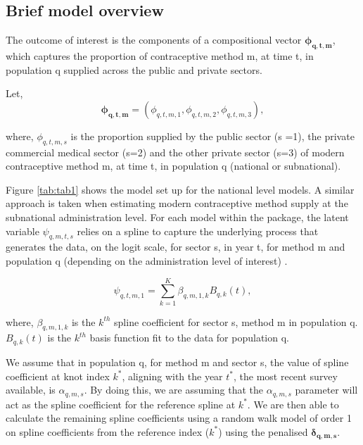 \hypertarget{brief-model-overview}{%
\subsection{Brief model overview}\label{brief-model-overview}}

The outcome of interest is the components of a compositional vector \(\boldsymbol{{\phi_{q,t,m}}}\), which captures the proportion of contraceptive method m, at time t, in population q supplied across the public and private sectors.

Let,
\begin{equation}
\boldsymbol{{\phi_{q,t,m}}} =(\phi_{q,t,m,1},\phi_{q,t,m,2},\phi_{q,t,m,3}),
   \label{eq:eq1}
\end{equation}

where, \newline
\(\phi_{q,t,m,s}\) is the proportion supplied by the public sector (s =1), the private commercial medical sector (s=2) and the other private sector (s=3) of modern contraceptive method m, at time t, in population q (national or subnational). \newline 

Figure \ref{tab:tab1} shows the model set up for the national level models. A similar approach is taken when estimating modern contraceptive method supply at the subnational administration level. For each model within the  package, the latent variable \(\psi_{q,m,t,s}\) relies on a spline to capture the underlying process that generates the data, on the logit scale, for sector s, in year t, for method m and population q (depending on the administration level of interest) .

\begin{equation}
   \psi_{q,t,m,1}=\sum_{k=1}^K \beta_{q,m,1,k} B_{q,k}(t),
   \label{eq:eq2}
\end{equation}

where, \newline
\(\beta_{q,m,1,k}\) is the \(k^{th}\) spline coefficient for sector s, method m in population q. \newline
\(B_{q,k}(t)\) is the \(k^{th}\) basis function fit to the data for population q. \newline

We assume that in population q, for method m and sector s, the value of spline coefficient at knot index \(k^*\), aligning with the year \(t^*\), the most recent survey available, is \(\alpha_{q, m, s}\). By doing this, we are assuming that the \(\alpha_{q,m,s}\) parameter will act as the spline coefficient for the reference spline at \(k^*\). We are then able to calculate the remaining spline coefficients using a random walk model of order 1 on spline coefficients from the reference index (\(k^*\)) using the penalised \(\boldsymbol{\delta_{q,m,s}}\).

